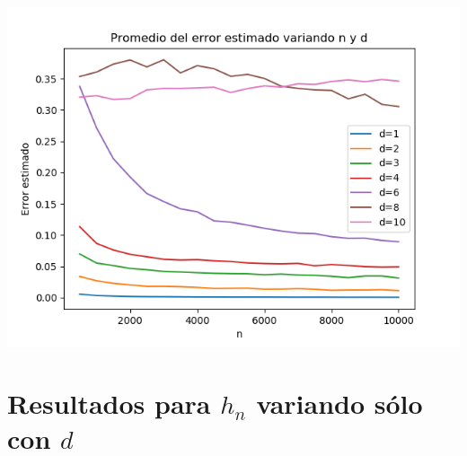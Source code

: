 \documentclass[12pt, a4paper]{article}
\begin{document}
\includegraphics[width=\textwidth]{figuras_h_dinamico/resultados-grales}


\section{Resultados para $h_n$ variando sólo con $d$}
\end{document}
